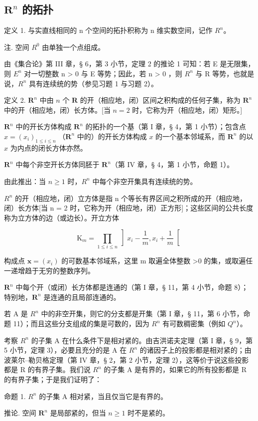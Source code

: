 \subsection{\texorpdfstring{\(\mathbf{R}^n\) 的拓扑}{R 的 n 次幂的拓扑}}

定义 1. 与实直线相同的 n 个空间的拓扑积称为 n 维实数空间，记作 \(R^{n}\)。

注. 空间 \(R^{0}\) 由单独一个点组成。

由《集合论》第 III 章，§ 6，第 3 小节，定理 2 的推论 1 可知：若 E 是无限集，则 \(E^{n}\) 对一切整数 n \textgreater{} 0 与 E 等势；因此，若 n \textgreater{} 0 ，则 \(R^{n}\) 与 R 等势，也就是说，\(R^{n}\) 具有连续统的势（参见习题 1 与习题 2）。

定义 2. \(\mathbf{R}^n\) 中由 \(n\) 个 \(\mathbf{R}\) 的开（相应地，闭）区间之积构成的任何子集，称为 \(\mathbf{R}^n\) 中的开（相应地，闭）长方体。{[}当 \(n = 2\) 时，它称为开（相应地，闭）矩形。{]}

\(\mathbf{R}^n\) 中的开长方体构成 \(\mathbf{R}^n\) 的拓扑的一个基（第 I 章，§ 4，第 1 小节）；包含点 \(x = (x_i)_{1 \leqslant i \leqslant n}\) （\(\mathbf{R}^n\) 中的）的开长方体构成 \(x\) 的一个基本邻域系，而 \(\mathbf{R}^n\) 的以 \(x\) 为内点的闭长方体亦然。

\(\mathbf{R}^n\) 中每个非空开长方体同胚于 \(\mathbf{R}^n\)（第 IV 章，§ 4，第 1 小节，命题 1）。

由此推出：当 \(n \geqslant 1\) 时，\(R^{n}\) 中每个非空开集具有连续统的势。

\(R^{n}\) 的开（相应地，闭）立方体是指 n 个等长有界区间之积所成的开（相应地，闭）长方体{[}当 n = 2 时，它称为开（相应地，闭）正方形{]}；这些区间的公共长度称为立方体的边（或边长）。开立方体

\[
\mathrm{K} _ {m} = \prod_ {1 \leqslant i \leqslant n} \left] x _ {i} - \frac {1}{m}, x _ {i} + \frac {1}{m} \right[
\]

构成点 \(\boldsymbol{x} = (x_{i})\) 的可数基本邻域系，这里 m 取遍全体整数 \textgreater0 的集，或取遍任一递增趋于无穷的整数序列。

\(\mathbf{R}^n\) 中每个开（或闭）长方体都是连通的（第 I 章，§ 11，第 4 小节，命题 8）；特别地，\(\mathbf{R}^n\) 是连通的且局部连通的。

若 A 是 \(R^{n}\) 中的非空开集，则它的分支都是开集（第 I 章，§ 11，第 6 小节，命题 11）；而且这些分支组成的集是可数的，因为 \(R^{n}\) 有可数稠密集（例如 \(Q^{n}\)）。

考察 \(R^{n}\) 的子集 A 在什么条件下是相对紧的。由吉洪诺夫定理（第 I 章，§ 9，第 5 小节，定理 3），必要且充分的是 A 在 \(R^{n}\) 的诸因子上的投影都是相对紧的；由波莱尔–勒贝格定理（第 IV 章，§ 2，第 2 小节，定理 2），这等价于说这些投影都是 R 的有界子集。我们说 \(R^{n}\) 的子集 A 是有界的，如果它的所有投影都是 R 的有界子集；于是我们证明了：

命题 1. \(R^{n}\) 的子集 A 相对紧，当且仅当它是有界的。

推论. 空间 \(\mathbf{R}^n\) 是局部紧的，但当 \(n \geqslant 1\) 时不是紧的。

